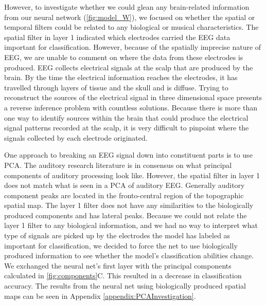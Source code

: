 However, to investigate whether we could glean any brain-related information from our neural network (\autoref{fig:model_W}), we focused on whether the spatial or temporal filters could be related to any biological or musical characteristics.
The spatial filter in layer 1 indicated which electrodes carried the \ac{EEG} data important for classification. 
However, because of the spatially imprecise nature of \ac{EEG}, we are unable to comment on where the data from these electrodes is produced.
\ac{EEG} collects electrical signals at the scalp that are produced by the brain.
By the time the electrical information reaches the electrodes, it has travelled through layers of tissue and the skull and is diffuse.
Trying to reconstruct the sources of the electrical signal in three dimensional space presents a reverse inference problem with countless solutions.
Because there is more than one way to identify sources within the brain that could produce the electrical signal patterns recorded at the scalp, it is very difficult to pinpoint where the signals collected by each electrode originated.

One approach to breaking an EEG signal down into constituent parts is to use \ac{PCA}.
The auditory research literature is in consensus on what principal components of auditory processing look like.
However, the spatial filter in layer 1 does not match what is seen in a \ac{PCA} of auditory \ac{EEG}.
Generally auditory component peaks are located in the fronto-central region of the topographic spatial map. 
The layer 1 filter does not have any similarities to the biologically produced components and has lateral peaks. 
Because we could not relate the layer 1 filter to any biological information, and we had no way to interpret what type of signals are picked up by the electrodes the model has labeled as important for classification, we decided to force the net to use biologically produced information to see whether the model's classification abilities change. 
We exchanged the neural net's first layer with the principal components calculated in \autoref{fig:components}C. 
This resulted in a decrease in classification accuracy. The results from the neural net using biologically produced spatial maps can be seen in Appendix \ref{appendix:PCAInvestigation}.

